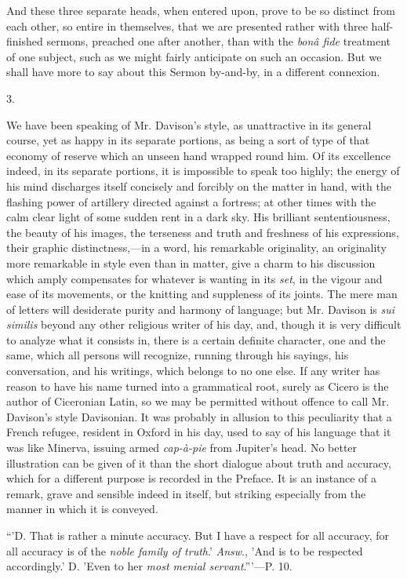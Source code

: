 And these three separate heads, when entered
upon, prove to be so distinct from each other, so entire in
themselves, that we are presented rather with three half-finished
sermons, preached one after another, than with the \emph{bonâ fide}
treatment of one subject, such as we might fairly anticipate on such
an occasion. But we shall have more to say about this Sermon
by-and-by, in a different connexion.

3.

We have been speaking of Mr. Davison's style, as
unattractive in its general course, yet as happy in its separate
portions, as being a sort of type of that economy of reserve which an
unseen hand wrapped round him. Of its excellence indeed, in its
separate portions, it is impossible to speak too highly; the energy of
his mind discharges itself concisely and forcibly on the matter in
hand, with the flashing power of artillery directed against a
fortress; at other times with the calm clear light of some sudden rent
in a dark sky. His brilliant sententiousness, the beauty of his
images, the terseness and truth and freshness of his expressions,
their graphic distinctness,—in a word, his remarkable originality,
an originality more remarkable in style even than in matter, give a
charm to his discussion which amply compensates for whatever is
wanting in its \emph{set}, in the vigour and ease of its movements, or the
knitting and suppleness of its joints. The mere man of letters will
desiderate purity and harmony of language; but Mr. Davison is \emph{sui
similis} beyond any other religious writer of his day, and, though
it is very difficult to analyze what it consists in, there is a
certain definite character, one and the same, which all persons will
recognize, running through his sayings, his conversation, and his
writings, which belongs to no one else. If any writer has reason
to have his name turned into a grammatical root, surely as Cicero is
the author of Ciceronian Latin, so we may be permitted without offence
to call Mr. Davison's style Davisonian. It was probably in allusion to
this peculiarity that a French refugee, resident in Oxford in his day,
used to say of his language that it was like Minerva, issuing armed \emph{cap-à-pie}
from Jupiter's head. No better illustration can be given of it than
the short dialogue about truth and accuracy, which for a different
purpose is recorded in the Preface. It is an instance of a remark,
grave and sensible indeed in itself, but striking especially from the
manner in which it is conveyed.

``'D.
That is rather a minute accuracy. But I have a respect for all
accuracy, for all accuracy is of the \emph{noble family of truth}.' \emph{Answ}.,
'And is to be respected accordingly.' D. 'Even to her \emph{most menial
servant}.'''—P. 10.

